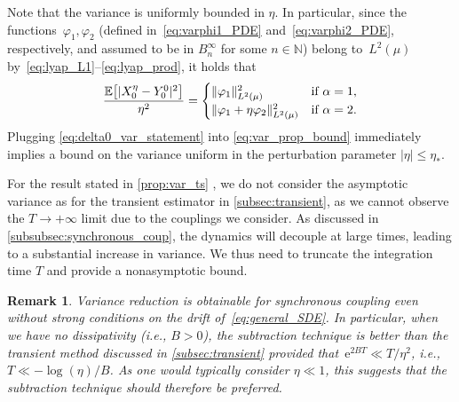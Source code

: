 \documentclass[11pt]{article}
\newcommand{\E}{\mathbb{E}}
\newcommand{\N}{\mathbb{N}}
\newcommand{\e}{\mathrm{e}}
\renewcommand{\leq}{\leqslant}
\DeclarePairedDelimiter\abs{\lvert}{\rvert}
\DeclarePairedDelimiter\norm{\lVert}{\rVert}
\DeclarePairedDelimiter\bkt{\lbrack}{\rbrack}
\newtheorem{remark}[theorem]{Remark}
\theoremstyle{definition}
\begin{document}
Note that the variance is uniformly bounded in $\eta$. In particular, since the functions~$\varphi_1,\varphi_2$ (defined in~\eqref{eq:varphi1_PDE} and~\eqref{eq:varphi2_PDE}, respectively, and assumed to be in $B^\infty_n$ for some $n\in\N$) belong to~$L^2(\mu)$ by~\eqref{eq:lyap_L1}--\eqref{eq:lyap_prod}, it holds that
\begin{equation}
	\frac{\E\bkt*{\abs{X_0^\eta - Y_0^0}^2}}{\eta^2} = 
	\begin{cases}
		\norm{\varphi_1}^2_{L^2(\mu)} &\text{if }\alpha = 1, \\
		\norm{\varphi_1 + \eta\varphi_2}^2_{L^2(\mu)} &\text{if }\alpha = 2.
	\end{cases}
\label{eq:delta0_var_statement}
\end{equation}
Plugging \eqref{eq:delta0_var_statement} into \eqref{eq:var_prop_bound} immediately implies a bound on the variance uniform in the perturbation parameter $|\eta| \leq \eta_*$.

For the result stated in \cref{prop:var_ts} , we do not consider the asymptotic variance as for the transient estimator in \cref{subsec:transient}, as we cannot observe the $T\to+\infty$ limit due to the couplings we consider. As discussed in \cref{subsubsec:synchronous_coup}, the dynamics will decouple at large times, leading to a substantial increase in variance. We thus need to truncate the integration time $T$ and provide a nonasymptotic bound.

\begin{remark}
Variance reduction is obtainable for synchronous coupling even without strong conditions on the drift of~\eqref{eq:general_SDE}. In particular, when we have no dissipativity (i.e., $B>0$), the subtraction technique is better than the transient method discussed in \cref{subsec:transient} provided that~$\e^{2BT} \ll T/\eta^2$, i.e., $T\ll -\log(\eta)/B$. As one would typically consider $\eta\ll 1$, this suggests that the subtraction technique should therefore be preferred. 
\end{remark}
\end{document}
